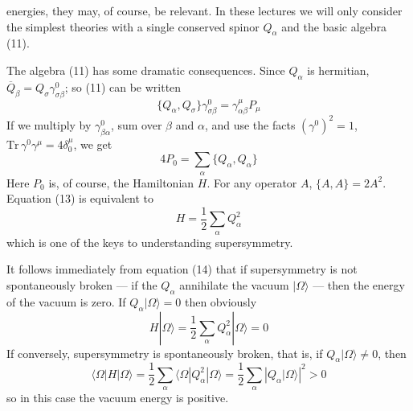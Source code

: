 
energies, they may, of course, be relevant. In these lectures we
will only consider the simplest theories with a single conserved
spinor $Q_\alpha$ and the basic algebra (11).

The algebra (11) has some dramatic consequences. Since $Q_\alpha$ is
hermitian, $\overline{Q}_\beta = Q_\sigma \gamma^0_{\sigma\beta}$; so (11) can be written
\begin{equation}
\{Q_\alpha, Q_\sigma\}\gamma^0_{\sigma\beta} = \gamma^\mu_{\alpha\beta} P_\mu
\tag{12}
\end{equation}
If we multiply by $\gamma^0_{\beta\alpha}$, sum over $\beta$ and $\alpha$, and use the facts $(\gamma^0)^2 = 1$,
$\mathrm{Tr}\,\gamma^0 \gamma^\mu = 4\delta^\mu_0$, we get
\begin{equation}
4P_0 = \sum_\alpha \{Q_\alpha, Q_\alpha\}
\tag{13}
\end{equation}
Here $P_0$ is, of course, the Hamiltonian $H$. For any operator $A$,
$\{A, A\} = 2A^2$. Equation (13) is equivalent to
\begin{equation}
H = \frac{1}{2}\sum_\alpha Q_\alpha^2
\tag{14}
\end{equation}
which is one of the keys to understanding supersymmetry.

It follows immediately from equation (14) that if supersymmetry
is not spontaneously broken --- if the $Q_\alpha$ annihilate the vacuum
$|\Omega\rangle$ --- then the energy of the vacuum is zero. If $Q_\alpha |\Omega\rangle = 0$ then
obviously
\begin{equation}
H |\Omega\rangle = \frac{1}{2}\sum_\alpha Q_\alpha^2 |\Omega\rangle = 0
\tag{15}
\end{equation}
If conversely, supersymmetry is spontaneously broken, that is, if
$Q_\alpha |\Omega\rangle \neq 0$, then
\begin{equation}
\langle \Omega | H | \Omega \rangle = \frac{1}{2}\sum_\alpha \langle \Omega | Q_\alpha^2 | \Omega \rangle = \frac{1}{2}\sum_\alpha \left|Q_\alpha |\Omega\rangle\right|^2 > 0
\tag{16}
\end{equation}
so in this case the vacuum energy is positive.\begingroup\renewcommand{\thefootnote}{\fnsymbol{footnote}}\footnotemark[1]\endgroup

